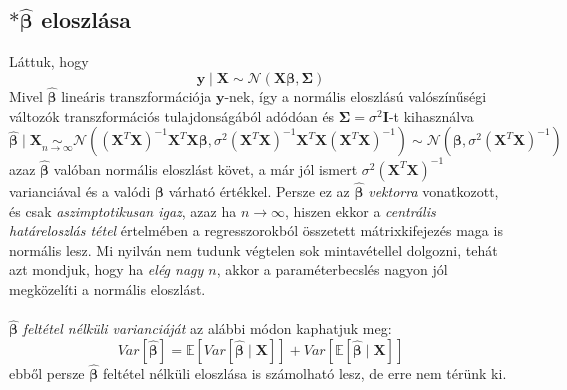 \documentclass[14p]{report}
\def\pmb{\boldsymbol}
\def\ebeta{\hat{\pmb{\beta}}}
\begin{document}
	\subsection{$*\ebeta$ eloszlása}
	Láttuk, hogy
	\[
		\pmb{y} \mid \pmb{X} \sim \mathcal{N}(\pmb{X}\pmb{\beta}, \pmb{\Sigma})
	\]
	Mivel $\ebeta$ lineáris transzformációja $\pmb{y}$-nek, így a normális eloszlású valószínűségi változók transzformációs tulajdonságából adódóan és $\pmb{\Sigma} = \sigma^2\pmb{I}$-t kihasználva
	\[
		\ebeta \mid \pmb{X} \underset{n \rightarrow \infty}{\sim} \mathcal{N}((\pmb{X}^T\pmb{X})^{-1}\pmb{X}^T\pmb{X}\pmb{\beta}, \sigma^2(\pmb{X}^T\pmb{X})^{-1}\pmb{X}^T\pmb{X}(\pmb{X}^T\pmb{X})^{-1}) \sim \mathcal{N}(\pmb{\beta}, \sigma^2(\pmb{X}^T\pmb{X})^{-1})
	\] 
	azaz $\ebeta$ valóban normális eloszlást követ, a már jól ismert $\sigma^2(\pmb{X}^T\pmb{X})^{-1}$ varianciával és a valódi $\pmb{\beta}$ várható értékkel. Persze ez az $\ebeta$ \emph{vektorra} vonatkozott, és csak \emph{aszimptotikusan igaz}, azaz ha $n \rightarrow \infty$, hiszen ekkor a \emph{centrális határeloszlás tétel} értelmében a regresszorokból összetett mátrixkifejezés maga is normális lesz. Mi nyilván nem tudunk végtelen sok mintavétellel dolgozni, tehát azt mondjuk, hogy ha \emph{elég nagy $n$}, akkor a paraméterbecslés nagyon jól megközelíti a normális eloszlást.
	\\
	\\
	$\ebeta$ \emph{feltétel nélküli varianciáját} az alábbi módon kaphatjuk meg:
	\[
		Var[\ebeta] = \mathbb{E}[Var[\ebeta \mid \pmb{X}]] + Var[\mathbb{E}[\ebeta \mid \pmb{X}]]
	\]
	ebből persze $\ebeta$ feltétel nélküli eloszlása is számolható lesz, de erre nem térünk ki.
	
\end{document}
